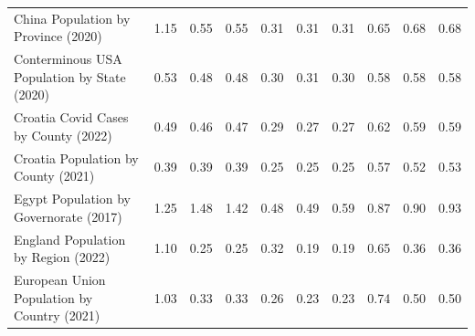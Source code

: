 \begin{tabular}{lccc|ccc|ccc}
                      China Population by Province (2020) &                      1.15 &                      0.55 &                         0.55 &                        0.31 &                        0.31 &                           0.31 &                          0.65 &                          0.68 &                             0.68 \\
              Conterminous USA Population by State (2020) &                      0.53 &                      0.48 &                         0.48 &                        0.30 &                        0.31 &                           0.30 &                          0.58 &                          0.58 &                             0.58 \\
                     Croatia Covid Cases by County (2022) &                      0.49 &                      0.46 &                         0.47 &                        0.29 &                        0.27 &                           0.27 &                          0.62 &                          0.59 &                             0.59 \\
                      Croatia Population by County (2021) &                      0.39 &                      0.39 &                         0.39 &                        0.25 &                        0.25 &                           0.25 &                          0.57 &                          0.52 &                             0.53 \\
                   Egypt Population by Governorate (2017) &                      1.25 &                      1.48 &                         1.42 &                        0.48 &                        0.49 &                           0.59 &                          0.87 &                          0.90 &                             0.93 \\
                      England Population by Region (2022) &                      1.10 &                      0.25 &                         0.25 &                        0.32 &                        0.19 &                           0.19 &                          0.65 &                          0.36 &                             0.36 \\
              European Union Population by Country (2021) &                      1.03 &                      0.33 &                         0.33 &                        0.26 &                        0.23 &                           0.23 &                          0.74 &                          0.50 &                             0.50 \\

\end{tabular}
